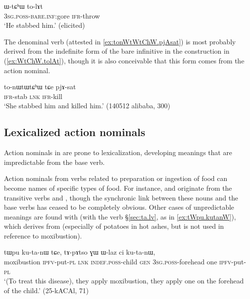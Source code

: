\begin{exe}
\ex \label{ex:WtChW.tolAt}
\gll  ɯ-tɕʰɯ to-lɤt \\
\textsc{3sg}.\textsc{poss}-\textsc{bare}.\textsc{inf}:gore \textsc{ifr}-throw \\
\glt `He stabbed him.' (elicited)
\end{exe}

The denominal verb  (attested in \ref{ex:tonWtWtChW.pjAsat}) is most probably derived from the indefinite form  of the bare infinitive in the construction in (\ref{ex:WtChW.tolAt}), though it is also conceivable that this form comes from the action nominal.

\begin{exe}
\ex \label{ex:tonWtWtChW.pjAsat}
\gll  to-nɯtɯtɕʰɯ tɕe pjɤ-sat \\
\textsc{ifr}-stab \textsc{lnk} \textsc{ifr}-kill \\
\glt `She stabbed him and killed him.' (140512 alibaba, 300)
\end{exe}

\subsection{Lexicalized action nominals}  \label{sec:lexicalized.action.nominals}
Action nominals in  are prone to lexicalization, developing meanings that are impredictable from the base verb.

Action nominals from verbs related to preparation or ingestion of food can become names of specific types of food. For instance,  and  originate from the transitive verbs  and , though the synchronic link between these nouns and the base verbs has ceased to be completely obvious. Other cases of unpredictable meanings are found with  (with the verb  §\ref{sec:ta.lv}, as in \ref{ex:tWpu.kutanW}), which derives from  (especially of potatoes in hot ashes, but is not used in reference to moxibustion).

\begin{exe}
\ex \label{ex:tWpu.kutanW}
\gll tɯpu ku-ta-nɯ tɕe, tɤ-pɤtso ɣɯ ɯ-laz ci ku-ta-nɯ, \\
moxibustion \textsc{ipfv}-put-\textsc{pl} \textsc{lnk} \textsc{indef}.\textsc{poss}-child \textsc{gen} \textsc{3sg}.\textsc{poss}-forehead one \textsc{ipfv}-put-\textsc{pl} \\
\glt `(To treat this disease), they apply moxibustion, they apply one on the forehead of the child.' (25-kACAl, 71)
\end{exe}

